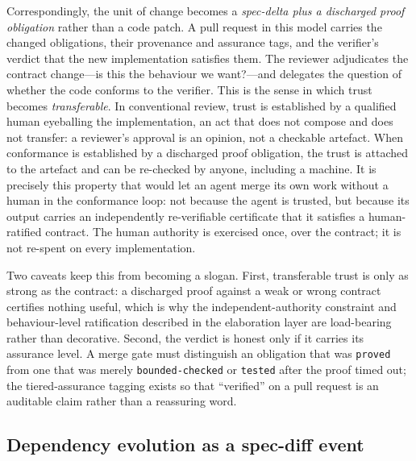 Correspondingly, the unit of change becomes a \emph{spec-delta plus a discharged
proof obligation} rather than a code patch. A pull request in this model carries
the changed obligations, their provenance and assurance tags, and the verifier's
verdict that the new implementation satisfies them. The reviewer adjudicates the
contract change---is this the behaviour we want?---and delegates the question of
whether the code conforms to the verifier. This is the sense in which trust
becomes \emph{transferable}. In conventional review, trust is established by a
qualified human eyeballing the implementation, an act that does not compose and
does not transfer: a reviewer's approval is an opinion, not a checkable artefact.
When conformance is established by a discharged proof obligation, the trust is
attached to the artefact and can be re-checked by anyone, including a machine.
It is precisely this property that would let an agent merge its own work without
a human in the conformance loop: not because the agent is trusted, but because
its output carries an independently re-verifiable certificate that it satisfies a
human-ratified contract. The human authority is exercised once, over the
contract; it is not re-spent on every implementation.

Two caveats keep this from becoming a slogan. First, transferable trust is only
as strong as the contract: a discharged proof against a weak or wrong contract
certifies nothing useful, which is why the independent-authority constraint and
behaviour-level ratification described in the elaboration layer are load-bearing
rather than decorative. Second, the verdict is honest only if it carries its
assurance level. A merge gate must distinguish an obligation that was
\texttt{proved} from one that was merely \texttt{bounded-checked} or
\texttt{tested} after the proof timed out; the tiered-assurance tagging exists so
that ``verified'' on a pull request is an auditable claim rather than a
reassuring word.

\subsection{Dependency evolution as a spec-diff event}\label{subsec:disc-depupgrade}

